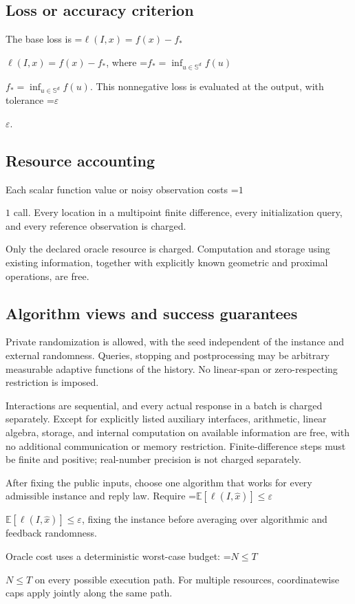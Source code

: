 \documentclass[10pt,a4paper]{article}
\newcommand{\AtlasMath}[1]{\par\begingroup\centering\setbox0=\hbox{$\displaystyle #1$}\ifdim\wd0>1.4\linewidth\typeout{ATLAS WIDE FORMULA: \the\wd0}\fi\ifdim\wd0>\linewidth\resizebox{\linewidth}{!}{\box0}\else\box0\fi\par\endgroup}
\newcommand{\AtlasInlineMath}[1]{\begingroup\setbox0=\hbox{$#1$}\ifdim\wd0>.4\linewidth\endgroup\AtlasMath{#1}\else\endgroup$#1$\fi}
\begin{document}
\subsection{Loss or accuracy criterion}
The base loss is \AtlasInlineMath{\ell(I,x)=f(x)-f_*}, where \AtlasInlineMath{f_*=\inf_{u\in \mathbb{S}^d}f(u)}. This nonnegative loss is evaluated at the output, with tolerance \AtlasInlineMath{\varepsilon}.

\subsection{Resource accounting}
Each scalar function value or noisy observation costs \AtlasInlineMath{1} call. Every location in a multipoint finite difference, every initialization query, and every reference observation is charged.

Only the declared oracle resource is charged. Computation and storage using existing information, together with explicitly known geometric and proximal operations, are free.

\subsection{Algorithm views and success guarantees}
Private randomization is allowed, with the seed independent of the instance and external randomness. Queries, stopping and postprocessing may be arbitrary measurable adaptive functions of the history. No linear-span or zero-respecting restriction is imposed.

Interactions are sequential, and every actual response in a batch is charged separately. Except for explicitly listed auxiliary interfaces, arithmetic, linear algebra, storage, and internal computation on available information are free, with no additional communication or memory restriction. Finite-difference steps must be finite and positive; real-number precision is not charged separately.

After fixing the public inputs, choose one algorithm that works for every admissible instance and reply law. Require \AtlasInlineMath{\mathbb{E}[\ell(I,\widehat{x})]\le \varepsilon}, fixing the instance before averaging over algorithmic and feedback randomness.

Oracle cost uses a deterministic worst-case budget: \AtlasInlineMath{N\le T} on every possible execution path. For multiple resources, coordinatewise caps apply jointly along the same path.
\end{document}
